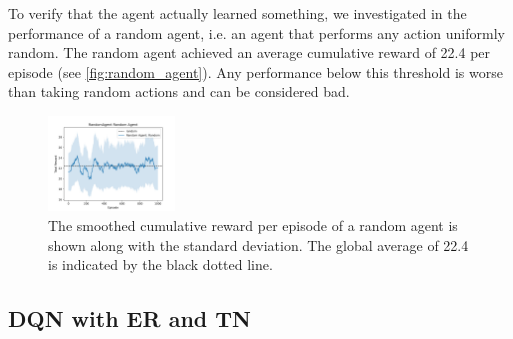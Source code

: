 \documentclass{article}
\begin{document}
To verify that the agent actually learned something, 
we investigated in the performance of a random agent, 
i.e. an agent that performs any action uniformly random. 
The random agent achieved an average cumulative reward of 22.4 per episode (see \autoref{fig:random_agent}).
Any performance below this threshold is worse than taking random actions 
and can be considered bad.


\begin{figure}[ht!]
   \centering
   \includegraphics[width=0.3\textwidth]{assets/random_agent_cumulative_reward.png}
   \caption{The smoothed cumulative reward per episode of a random agent is shown 
      along with the standard deviation. The global average of 22.4 is indicated by the black dotted line.
   }
   \label{fig:random_agent}
\end{figure}

\subsection{DQN with ER and TN}
\label{subsec:dqn-with-er-and-tn}

\end{document}
